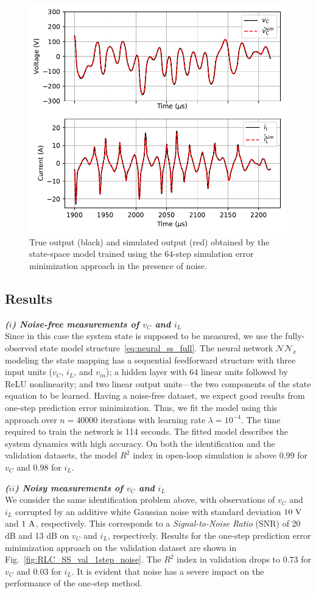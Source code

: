 \documentclass{article}
\newcommand{\NN}{\mathcal{N\!N}} %
\newcommand{\numiter}{n}
\begin{document}
\begin{figure}
\centering
   \includegraphics[width=.7\linewidth]{fig/RLC_SS_val_64step_noise.pdf}
\caption{True output (black) and  simulated output (red) obtained by the state-space model trained using the $64$-step simulation error minimization approach in the presence of noise.}
\label{fig:RLC_SS_val_64step_noise}
\end{figure}

\subsection{Results}
\emph{\bf{($i$) Noise-free measurements of $v_C$ and $i_L$}}
\ \\
Since in this case the system state is supposed to be measured, we use the fully-observed state model structure~\eqref{eq:neural_ss_full}.
The neural network $\NN_x$ modeling the state mapping has a sequential feedforward structure with three input units ($v_C$, $i_L$, and $v_{in}$); a hidden layer with 64 linear units followed by ReLU nonlinearity; and two linear output units---the two components of the state equation to be learned. 
Having a noise-free dataset, we expect good results from one-step prediction error minimization.
Thus, we fit the model using this approach over $\numiter=40000$ iterations with learning rate $\lambda= 10^{-4}$. The time required to train the network is 114 seconds.
The fitted model describes the system dynamics with high accuracy. On both the identification and the validation datasets, the model $R^2$ index in open-loop simulation is above $0.99$ for $v_C$ and $0.98$ for $i_L$. 


\emph{\bf{($ii$) Noisy measurements of $v_C$ and $i_L$}}
\ \\
We consider the same identification problem above, with observations of $v_C$ and $i_L$ corrupted by an additive white Gaussian noise with standard deviation $10~\rm V$ and $1~\rm A$, respectively. This corresponds to a \emph{Signal-to-Noise Ratio} (SNR) of  20 dB and 13 dB on  $v_C$ and $i_L$, respectively.  
Results for the one-step prediction error minimization approach on the validation dataset are shown in Fig.~\ref{fig:RLC_SS_val_1step_noise}. 
 The  $R^2$ index in validation drops to $0.73$ for $v_C$ and $0.03$ for  $i_L$.  %
It is evident that noise has a severe impact on the performance of the one-step method. 
\end{document}

